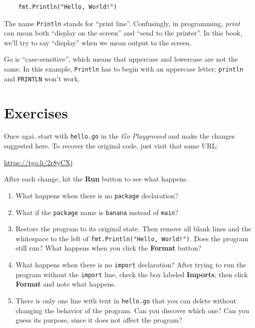 \begin{lstlisting}
	fmt.Println("Hello, World!")
\end{lstlisting}

The name {\tt Println} stands for ``print line''. Confusingly, in programming,
{\em print} can mean both ``display on the screen'' and ``send to the
printer''. In this book, we'll try to say ``display'' when we mean output to
the screen.

 Go is ``case-sensitive'', which means that uppercase
and lowercase are not the same. In this example, {\tt Println} has to begin
with an uppercase letter; {\tt println} and {\tt PRINTLN} won't work.

\section{Exercises}

\begin{exercise}

Once agai, start with {\tt hello.go} in the {\it Go Playground} and make the
changes suggested here. To recover the original code, just visit that same
URL:

\url{https://tgo.li/2r8yCXj}

After each change, hit the {\bf Run} button to see what happens.

\begin{enumerate}

\item What happens when there is no {\tt package} declaration?

\item What if the {\tt package} name is {\tt banana} instead of {\tt main}? 

\item Restore the program to its original state. Then remove all blank lines
and the whitespace to the left of {\tt fmt.Println("Hello, World!")}. Does the
program still run? What happens when you click the {\bf Format} button?

\item What happens when there is no {\tt import} declaration? After trying 
to run the program without the {\tt import} line, check the box labeled
{\bf Imports}, then click {\bf Format} and note what happens.

\item There is only one line with text in {\tt hello.go} that you can delete
without changing the behavior of the program. Can you discover which one?
Can you guess its purpose, since it does not affect the program?


\end{enumerate}

\end{exercise}



